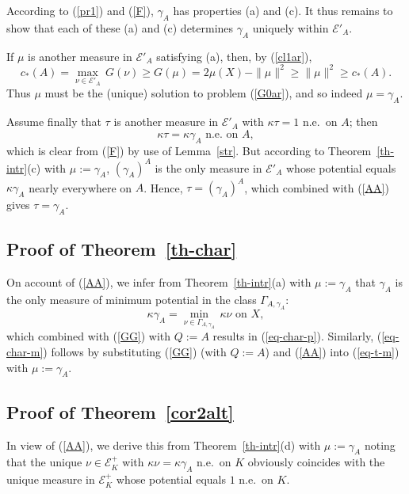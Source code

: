 \documentclass[12pt,a4paper,reqno]{amsart} %
\theoremstyle{lause}
\theoremstyle{maaritelma}
\theoremstyle{lause}
\theoremstyle{maaritelma}
\numberwithin{equation}{section}
\begin{document}
According to (\ref{pr1}) and (\ref{F}), $\gamma_A$ has properties (a) and (c). It thus remains to show that each of these (a) and (c) determines $\gamma_A$ uniquely within $\mathcal E'_A$.

If $\mu$ is another measure in $\mathcal E'_A$ satisfying (a), then,  by (\ref{cl1ar}),
\[c_*(A)=\max_{\nu\in\mathcal E'_A}\,G(\nu)\geqslant G(\mu)=2\mu(X)-\|\mu\|^2\geqslant\|\mu\|^2\geqslant c_*(A).\]
Thus $\mu$ must be the (unique) solution to problem (\ref{G0ar}), and so indeed $\mu=\gamma_A$.

Assume finally that $\tau$ is another measure in $\mathcal E'_A$ with $\kappa\tau=1$ n.e.\ on $A$; then
\begin{equation*}\label{cc}\kappa\tau=\kappa\gamma_A\text{ \ n.e.\ on $A$},\end{equation*}
which is clear from (\ref{F}) by use of Lemma~\ref{str}. But according to Theorem~\ref{th-intr}(c) with $\mu:=\gamma_A$, $(\gamma_A)^A$ is the only measure in $\mathcal E'_A$ whose potential equals $\kappa\gamma_A$ nearly everywhere on $A$. Hence, $\tau=(\gamma_A)^A$, which combined with (\ref{AA}) gives $\tau=\gamma_A$.

\subsection{Proof of Theorem~\ref{th-char}}\label{ch-pr2''} On account of (\ref{AA}), we infer from Theorem~\ref{th-intr}(a) with $\mu:=\gamma_A$ that $\gamma_A$ is the only measure of minimum potential in the class $\Gamma_{A,\gamma_A}$:
\begin{equation*}\label{comp}\kappa\gamma_A=\min_{\nu\in\Gamma_{A,\gamma_A}}\,\kappa\nu\text{ \ on $X$},\end{equation*}
which combined with (\ref{GG}) with $Q:=A$ results in (\ref{eq-char-p}). Similarly, (\ref{eq-char-m}) follows by substituting (\ref{GG}) (with $Q:=A$) and (\ref{AA}) into (\ref{eq-t-m}) with $\mu:=\gamma_A$.

\subsection{Proof of Theorem~\ref{cor2alt}}\label{ch-pr2} In view of (\ref{AA}), we derive this from Theorem~\ref{th-intr}(d) with $\mu:=\gamma_A$ noting that the unique $\nu\in\mathcal E^+_K$ with  $\kappa\nu=\kappa\gamma_A$ n.e.\ on $K$ obviously coincides with the unique measure in $\mathcal E^+_K$ whose potential equals $1$ n.e.\ on $K$.
\end{document}
